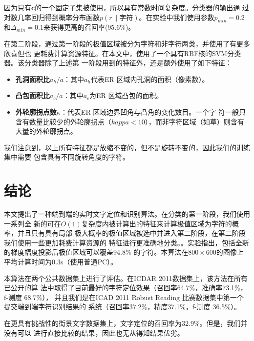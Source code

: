 \documentclass[UTF8]{ctexart}
\begin{document}
因为只有$\mathbf{c}$的一个固定子集被使用，所以具有常数时间复杂度。分类器的输出通
过对数几率回归得到概率分布函数$p(r\|字符)$。在实验中我们使用参数$p_{min} = 0.2$
和$\Delta_{min}=0.1$来获得更高的召回率(95.6\%)。

在第二阶段，通过第一阶段的极值区域被分为字符和非字符两类，并使用了有更多欣喜但也
更耗费计算资源特征。在本文中，使用了一个具有RBF核的SVM分类器。该分类器除了上述第
一阶段用到的特征外，还是额外使用了如下特征：

\begin{itemize}
\item \textbf{孔洞面积比$a_h/a$}：其中$a_h$代表ER 区域内孔洞的面积（像素数）。
\item \textbf{凸包面积比$a_c/a$}：其中$a_c$为ER 区域凸包的面积。
\item \textbf{外轮廓拐点数$\kappa$}：代表ER 区域边界凹角与凸角的变化数目。一个字
  符一般只含有数量比较少的外轮廓拐点（$kappa < 10$），而非字符区域（如草）则含有
  大量的外轮廓拐点。
\end{itemize}

我们注意到，以上所有特征都是放缩不变的，但不是旋转不变的，因此我们的训练集中需要
包含具有不同旋转角度的字符。

\section{结论}

本文提出了一种端到端的实时文字定位和识别算法。在分类的第一阶段，我们使用一系列全
新的可在$O(1)$复杂度内被计算出的特征来计算极值区域为字符的概率，并且只有具有局部
极大概率的极值区域被选中并进入第二阶段，在第二阶段我们使用一些更加耗费计算资源的
特征进行更准确地分类。。实验指出，包括全新的梯度幅度投影后极值区域可以覆盖94.8\%
的字符。本算法在$800 \times 600$的图像上平均计算时间为0.3s（使用普通PC）。

本算法在两个公共数据集上进行了评估。在ICDAR 2011数据集上，该方法在所有已公开的算
法中取得了目前最好的字符定位效果（召回率64.7\%，准确率73.1\%，f-测度 68.7\%），
并且我们是在ICAD 2011 Robust Reading 比赛数据集中第一个提交端到端字符识别结果的
系统（召回率37.2\%，精度37.1\%，f-测度 36.5\%）。

在更具有挑战性的街景文字数据集上，文字定位的召回率为32.9\%。但是，我们并没有可以
进行直接比较的结果，因此也无从得知结果优劣。
\end{document}
